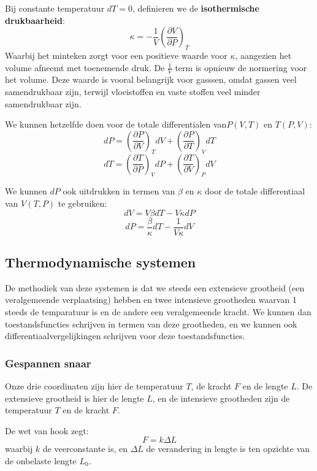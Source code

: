 Bij constante temperatuur \(dT = 0\), definieren we de \textbf{isothermische drukbaarheid}:
\begin{equation}
    \label{eq:isothermische-drukbaarheid}
    \kappa = -\frac{1}{V} \left( \frac{\partial V}{\partial P} \right)_T
\end{equation}
Waarbij het minteken zorgt voor een positieve waarde voor \(\kappa\), aangezien het volume afneemt met toenemende druk. De \(\frac{1}{V}\) term is opnieuw de normering voor het volume.
Deze waarde is vooral belangrijk voor gasssen, omdat gassen veel samendrukbaar zijn, terwijl vloeistoffen en vaste stoffen veel minder samendrukbaar zijn.

We kunnen hetzelfde doen voor de totale differentialen van\(P(V,T)\) en \(T(P,V)\):
\[dP = \left( \frac{\partial P}{\partial V} \right)_T dV + \left( \frac{\partial P}{\partial T} \right)_V dT\]
\[dT = \left( \frac{\partial T}{\partial P} \right)_V dP + \left( \frac{\partial T}{\partial V} \right)_P dV\]

We kunnen \(dP\) ook uitdrukken in termen van \(\beta\) en \(\kappa\) door de totale differentiaal van \(V(T,P)\) te gebruiken:
\[dV = V \beta dT - V \kappa dP\]
\[dP = \frac{\beta}{\kappa} dT - \frac{1}{V \kappa} dV\]

\subsection{Thermodynamische systemen}
De methodiek van deze systemen is dat we steeds een extensieve grootheid (een veralgemeende verplaatsing) hebben en twee intensieve grootheden waarvan 1 steeds de temparatuur is en de andere een veralgemeende kracht.
We kunnen dan toestandsfuncties schrijven in termen van deze grootheden, en we kunnen ook differentiaalvergelijkingen schrijven voor deze toestandsfuncties. 
\subsubsection{Gespannen snaar}
Onze drie coordinaten zijn hier de temperatuur \(T\), de kracht \(F\) en de lengte \(L\). De extensieve grootheid is hier de lengte \(L\), en de intensieve grootheden zijn de temperatuur \(T\) en de kracht \(F\).

De wet van hook zegt:
\[F = k \Delta L\]
waarbij \(k\) de veerconstante is, en \(\Delta L\) de verandering in lengte is ten opzichte van de onbelaste lengte \(L_0\).

